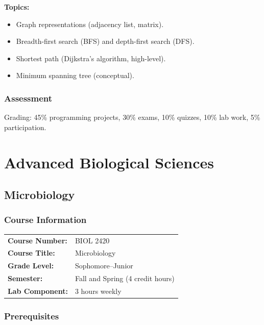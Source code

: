 \documentclass[12pt,oneside]{book}
\begin{document}
\textbf{Topics:}
\begin{itemize}
    \item Graph representations (adjacency list, matrix).
    \item Breadth-first search (BFS) and depth-first search (DFS).
    \item Shortest path (Dijkstra’s algorithm, high-level).
    \item Minimum spanning tree (conceptual).
\end{itemize}

\section{Assessment}

Grading: 45\% programming projects, 30\% exams, 10\% quizzes, 10\% lab work, 5\% participation.


\part{Advanced Biological Sciences}

\chapter{Microbiology}

\section{Course Information}

\begin{tabular}{ll}
\textbf{Course Number:} & BIOL 2420 \\
\textbf{Course Title:} & Microbiology \\
\textbf{Grade Level:} & Sophomore--Junior \\
\textbf{Semester:} & Fall and Spring (4 credit hours) \\
\textbf{Lab Component:} & 3 hours weekly \\
\end{tabular}

\section{Prerequisites}
\end{document}
